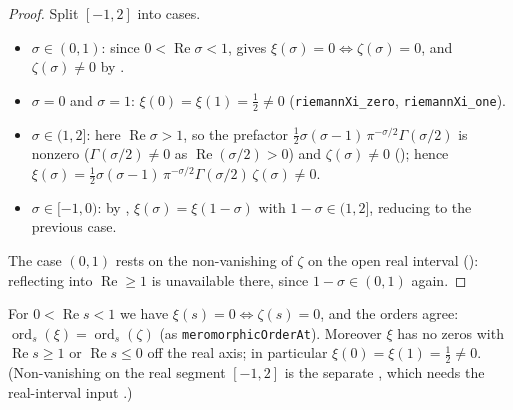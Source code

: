 \begin{proof}
\leanok
{}
Split $[-1,2]$ into cases.
\begin{itemize}
\item $\sigma\in(0,1)$: since $0<\operatorname{Re}\sigma<1$, 
  gives $\xi(\sigma)=0\iff\zeta(\sigma)=0$, and $\zeta(\sigma)\neq0$ by
  .
\item $\sigma=0$ and $\sigma=1$: $\xi(0)=\xi(1)=\tfrac12\neq0$
  (\texttt{riemannXi\_zero}, \texttt{riemannXi\_one}).
\item $\sigma\in(1,2]$: here $\operatorname{Re}\sigma>1$, so the prefactor
  $\tfrac12\sigma(\sigma-1)\,\pi^{-\sigma/2}\Gamma(\sigma/2)$ is nonzero
  ($\Gamma(\sigma/2)\neq0$ as $\operatorname{Re}(\sigma/2)>0$) and $\zeta(\sigma)\neq0$
  (); hence
  $\xi(\sigma)=\tfrac12\sigma(\sigma-1)\,\pi^{-\sigma/2}\Gamma(\sigma/2)\,\zeta(\sigma)
  \neq0$.
\item $\sigma\in[-1,0)$: by ,
  $\xi(\sigma)=\xi(1-\sigma)$ with $1-\sigma\in(1,2]$, reducing to the previous case.
\end{itemize}
The case $(0,1)$ rests on the non-vanishing of $\zeta$ on the open real interval
(): reflecting into $\operatorname{Re}\ge1$ is unavailable
there, since $1-\sigma\in(0,1)$ again.
\end{proof}

\begin{lemma}
\label{lem:nf_xi_zeros}
\leanok
{}
For $0<\operatorname{Re} s<1$ we have $\xi(s)=0 \iff \zeta(s)=0$, and the orders agree:
$\operatorname{ord}_s(\xi)=\operatorname{ord}_s(\zeta)$ (as
\texttt{meromorphicOrderAt}). Moreover $\xi$ has no zeros with
$\operatorname{Re} s\ge 1$ or $\operatorname{Re} s\le 0$ off the real axis; in
particular $\xi(0)=\xi(1)=\tfrac12\neq0$. (Non-vanishing on the real segment
$[-1,2]$ is the separate , which needs the
real-interval input .)
\end{lemma}

